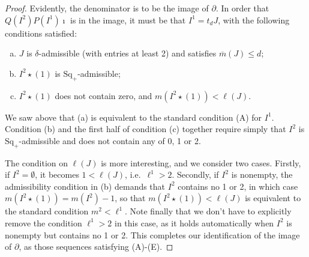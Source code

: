 \documentclass[11pt]{article}
\renewcommand{\Q}{Q}
\newcommand{\SqShift}{\Sq_{+}}
\newcommand{\Sq}{\mathrm{Sq}}
\newcommand{\minDim}{m}
\newcommand{\minDimP}{\overline{m}}
\begin{document}
\begin{CalculatingRepeatedKoszul}
\begin{proof}
Evidently, the denominator is to be the image of $\partial$. In order that $\Q(I^2)P(I^1)\imath$ is in the image, it must be that $I^1=t_dJ$, with the following conditions satisfied:
\begin{enumerate}[a)]
\squishlist
\setlength{\parindent}{.25in}
\item $J$ is $\delta$-admissible (with entries at least 2) and satisfies $\minDimP(J)\leq d$;
\item $I^2\star(1)$ is $\SqShift$-admissible;
\item $I^2\star(1)$ does not contain zero, and $\minDim(I^2\star(1))<\ell(J)$.
\end{enumerate}
We saw above that (a) is equivalent to the standard condition (A) for $I^1$. Condition (b) and the first half of condition (c) together require simply that $I^2$ is $\SqShift$-admissible and does not contain any of 0, 1 or 2.

The condition on $\ell(J)$ is more interesting, and we consider two cases. Firstly, if $I^2=\emptyset$, it becomes $1<\ell(J)$, i.e.\ $\ell^1>2$. Secondly, if $I^2$ is nonempty, the admissibility condition in (b) demands that $I^2$ contains no 1 or 2, in which case $\minDim(I^2\star(1))=\minDim(I^2)-1$, so that $\minDim(I^2\star(1))<\ell(J)$ is equivalent to the standard condition $\minDim^2<\ell^1$. Note finally that we don't have to explicitly remove the condition $\ell^1>2$ in this case, as it holds automatically when $I^2$ is nonempty but contains no 1 or 2. This completes our identification of the image of $\partial$, as those sequences satisfying (A)-(E).




\end{proof}
\end{CalculatingRepeatedKoszul}
\end{document}
